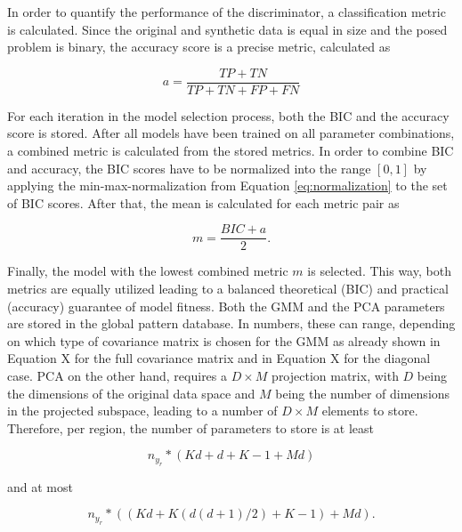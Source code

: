 \documentclass[../../main.tex]{subfiles}
\begin{document}
 In order to quantify the performance of the discriminator, a classification metric is calculated. Since the original and synthetic data is equal in size and the posed problem is binary, the accuracy score is a precise metric, calculated as

 \begin{equation}
    a = \frac{TP + TN}{TP + TN + FP + FN}
 \end{equation}

 For each iteration in the model selection process, both the BIC and the accuracy score is stored. After all models have been trained on all parameter combinations, a combined metric is calculated from the stored metrics. In order to combine BIC and accuracy, the BIC scores have to be normalized into the range $[0, 1]$ by applying the min-max-normalization from Equation \ref{eq:normalization} to the set of BIC scores. After that, the mean is calculated for each metric pair as
 
 \begin{equation}
    m = \frac{BIC + a}{2}.
 \end{equation}

 Finally, the model with the lowest combined metric $m$ is selected. This way, both metrics are equally utilized leading to a balanced theoretical (BIC) and practical (accuracy) guarantee of model fitness. Both the GMM and the PCA parameters are stored in the global pattern database. In numbers, these can range, depending on which type of covariance matrix is chosen for the GMM as already shown in Equation X for the full covariance matrix and in Equation X for the diagonal case. PCA on the other hand, requires a $D \times M$ projection matrix, with $D$ being the dimensions of the original data space and $M$ being the number of dimensions in the projected subspace, leading to a number of $D \times M$ elements to store. Therefore, per region, the number of parameters to store is at least
 
 \begin{equation}
    n_{y_r} * ( Kd + d +K-1 + Md  )
 \end{equation}

 and at most

 \begin{equation}
    n_{y_r} * ((Kd + K(d(d+1)/2)+K-1) + Md  ).
 \end{equation}

\end{document}
